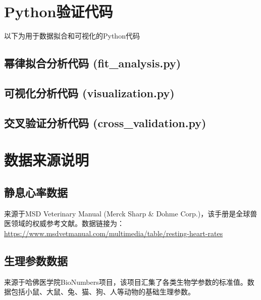 \newpage
\appendix

\section{Python验证代码}

以下为用于数据拟合和可视化的Python代码

\subsection*{幂律拟合分析代码 (fit\_analysis.py)}



\subsection*{可视化分析代码 (visualization.py)}



\subsection*{交叉验证分析代码 (cross\_validation.py)}



\section{数据来源说明}

\subsection*{静息心率数据}
来源于MSD Veterinary Manual (Merck Sharp \& Dohme Corp.)，该手册是全球兽医领域的权威参考文献。数据链接为：\url{https://www.msdvetmanual.com/multimedia/table/resting-heart-rates}

\subsection*{生理参数数据}
来源于哈佛医学院BioNumbers项目，该项目汇集了各类生物学参数的标准值。数据包括小鼠、大鼠、兔、猫、狗、人等动物的基础生理参数。

